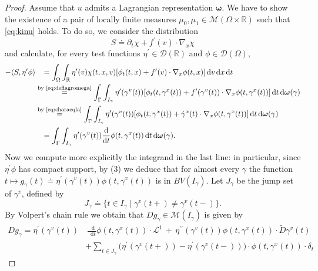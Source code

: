 \documentclass[11pt, twoside, reqno]{amsart}
\theoremstyle{definition}
\theoremstyle{remark}
\numberwithin{equation}{section}
\newcommand*\dif{\mathop{}\!\mathrm{d}}
\newcommand{\second}{{\prime \prime}}
\newcommand{\bs}[1]{\boldsymbol{#1}}
\newcommand{\msc}[1]{\mathscr{#1}}
\newcommand{\wt}[1]{\widetilde{#1}}
\begin{document}
\begin{proof}
Assume that $u$ admits a Lagrangian representation $\bs \omega$. We have to show the existence of a pair of locally finite measures $\mu_0, \mu_1 \in \msc M(\Omega \times \mathbb R)$ such that \eqref{eq:kinu} holds. To do so, we consider the distribution $$S \doteq \partial_t \chi + f^{\prime}(v) \cdot \nabla_x \chi$$ and calculate, for every test functions $\eta^\prime \in \msc D(\mathbb R)$ and $\phi \in \msc D(\Omega)$,
\begin{equation}\label{eq:Scomput}
    \begin{aligned}
-\langle S, \eta^{\prime} \phi \rangle & \; \; \; =   \int_\Omega \int_\mathbb R \eta^{\prime}(v) \chi(t, x, v) [\phi_t(t, x) + f^{\prime} (v)\cdot \nabla_x \phi (t, x)] \dif v \dif x \dif t\\
          &  \stackrel{\text{by \eqref{eq:deflagromega}}} {=}   \int_{\Gamma}  \int_{I_{\gamma}} \eta^{\prime}(\gamma^v(t)) [\phi_t(t, \gamma^x(t)) + f^{\prime} (\gamma^v(t))\cdot \nabla_x \phi (t, \gamma^x(t))] \dif t \dif \bs \omega(\gamma) \\
          & \stackrel{\text{by \eqref{eq:charaeqla}}}{=} \int_{\Gamma} \int_{I_{\gamma}} \eta^{\prime}(\gamma^v(t)) [\phi_t(t, \gamma^x(t)) + \dot \gamma^x(t)\cdot \nabla_x \phi (t, \gamma^x(t))] \dif t \dif \bs \omega(\gamma) \\
          & \; \;  \;=    \int_{\Gamma} \int_{I_{\gamma}} \eta^{\prime}(\gamma^v(t)) \frac{\dif}{\dif t} \phi(t, \gamma^x(t)) \dif t\dif \bs \omega(\gamma).
    \end{aligned}
\end{equation}
Now we compute more explicitly the integrand in the last line: in particular, since $\eta^\prime \phi$ has compact support, by (3) we deduce that for almost every $\gamma$ the function  $t \mapsto g_{\gamma}(t)\doteq \eta^{\prime}(\gamma^v(t)) \phi(t, \gamma^x(t))$ is in $BV(I_\gamma)$. Let $J_\gamma$ be the jump set of $\gamma^v$, defined by 
$$
J_\gamma \doteq \big\{ t \in I_\gamma \; | \; \gamma^v(t+) \neq \gamma^v(t-)\big\}.
$$
By Volpert's chain rule we obtain that $ D g_{\gamma} \in \msc M(I_{\gamma})$ is given by 
$$
\begin{aligned}
     D g_{\gamma}   =   \eta^{\prime}(\gamma^v(t))& \,\frac{\dif}{\dif t}\phi(t, \gamma^x(t)) \cdot \msc L^1 \,+\, \eta^{\second}(\gamma^v(t)) \phi(t, \gamma^x(t)) \cdot \wt D \gamma^v(t) \\
    & +  \sum_{t \in J_\gamma} \big(\eta^{\prime}(\gamma^v(t+))-\eta^{\prime}(\gamma^v(t-))\big) \cdot \phi(t, \gamma^x(t)) \cdot \delta_t

\end{aligned}$$
\end{proof}
\end{document}
